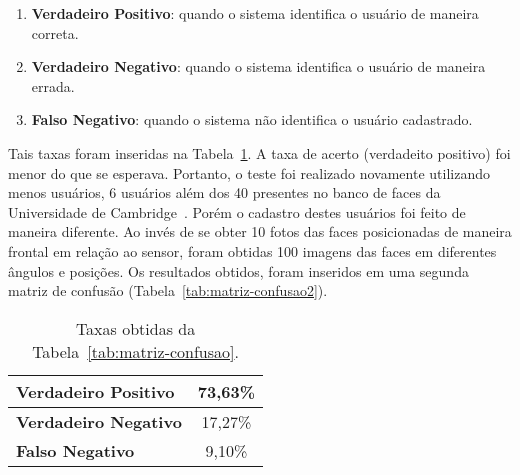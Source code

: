 	\begin{enumerate}
		\item \textbf{Verdadeiro Positivo}: quando o sistema identifica o usuário de maneira correta.
		\item \textbf{Verdadeiro Negativo}: quando o sistema identifica o usuário de maneira errada.
		\item \textbf{Falso Negativo}: quando o sistema não identifica o usuário cadastrado.
	\end{enumerate}

	Tais taxas foram inseridas na Tabela~\ref{tab:taxas}. A taxa de acerto (verdadeito positivo) foi menor do que se esperava. Portanto, o teste foi realizado novamente utilizando menos usuários, 6 usuários além dos 40 presentes no banco de faces da Universidade de Cambridge~\cite{cambridgeFaceDb}. Porém o cadastro destes usuários foi feito de maneira diferente. Ao invés de se obter 10 fotos das faces posicionadas de maneira frontal em relação ao sensor, foram obtidas 100 imagens das faces em diferentes ângulos e posições. Os resultados obtidos, foram inseridos em uma segunda matriz de confusão (Tabela~\ref{tab:matriz-confusao2}).

	\begin{table}[htb]
		\begin{center}
			\caption{Taxas obtidas da Tabela~\ref{tab:matriz-confusao}.}
			\label{tab:taxas}
			\begin{tabular}{|l|c|}
				\hline \bf Verdadeiro Positivo & 73,63\% \\
				\hline \bf Verdadeiro Negativo & 17,27\% \\
				\hline \bf Falso Negativo & 9,10\% \\
				\hline
			\end{tabular}
		\end{center}
	\end{table}


